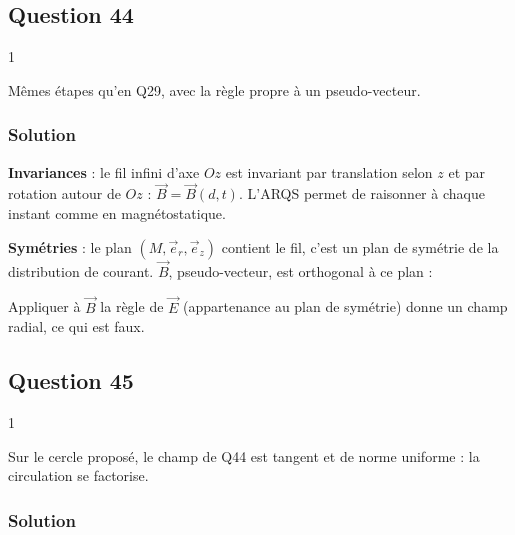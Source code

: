 \documentclass[11pt,a4paper]{article}
\newcommand{\equationajustee}[1]{%
  \sbox{\boiteequation}{$\displaystyle #1$}%
  \ifdim\wd\boiteequation>\linewidth
    \[\resizebox{\linewidth}{!}{\usebox{\boiteequation}}\]%
  \else
    \[#1\]%
  \fi}
\begin{document}
\hypertarget{question-44}{%
\subsection{Question 44}\label{question-44}}

\begin{indication}{1}

Mêmes étapes qu'en Q29, avec la règle propre à un pseudo-vecteur.

\end{indication}

\hypertarget{solution-43}{%
\subsubsection{Solution}\label{solution-43}}

\textbf{Invariances} : le fil infini d'axe \(Oz\) est invariant par translation selon \(z\) et par rotation autour de \(Oz\) : \(\vec B=\vec B(d,t)\). L'ARQS permet de raisonner à chaque instant comme en magnétostatique.

\textbf{Symétries} : le plan \((M,\vec e_r,\vec e_z)\) contient le fil, c'est un plan de symétrie de la distribution de courant. \(\vec B\), pseudo-vecteur, est orthogonal à ce plan :
\equationajustee{\boxed{\vec B=B(d,t)\,\vec e_\theta}}

\begin{piege}

Appliquer à \(\vec B\) la règle de \(\vec E\) (appartenance au plan de symétrie) donne un champ radial, ce qui est faux.

\end{piege}

\hypertarget{question-45}{%
\subsection{Question 45}\label{question-45}}

\begin{indication}{1}

Sur le cercle proposé, le champ de Q44 est tangent et de norme uniforme : la circulation se factorise.

\end{indication}

\hypertarget{solution-44}{%
\subsubsection{Solution}\label{solution-44}}
\end{document}
